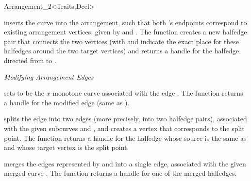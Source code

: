 \begin{ccRefClass}{Arrangement_2<Traits,Dcel>}
\begin{ccAdvanced}
  {inserts the curve  into the arrangement, such that both 's
   endpoints correspond to existing arrangement vertices, given by
    and . The function creates a
   new halfedge pair that connects the two vertices (with  and
    indicate the exact place for these halfedges around the two
   target vertices) and returns a handle for the halfedge directed from
    to .
   }

\end{ccAdvanced}

{\sl Modifying Arrangement Edges}

   {sets  to be the $x$-monotone curve associated with the edge .
    The function returns a handle for the modified edge (same as ).
    }

  {splits the edge  into two edges (more precisely, into two halfedge
   pairs), associated with the given subcurves  and , and
   creates a vertex that corresponds to the split point. 
   The function returns a handle for the halfedge whose source is the same
   as  and whose target vertex is the split point.
   }

  {merges the edges represented by  and  into
   a single edge, associated with the given merged curve . 
   The function returns a handle for one of the merged halfedges.
   }


\end{ccRefClass}
